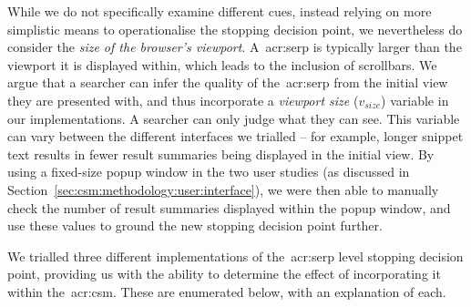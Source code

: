 While we do not specifically examine different cues, instead relying on more simplistic means to operationalise the stopping decision point, we nevertheless do consider the \emph{size of the browser's viewport}. A~\gls{acr:serp} is typically larger than the viewport it is displayed within, which leads to the inclusion of scrollbars. We argue that a searcher can infer the quality of the~\gls{acr:serp} from the initial view they are presented with, and thus incorporate a \emph{viewport size} ($v_{size}$) variable in our implementations. A searcher can only judge what they can see. This variable can vary between the different interfaces we trialled -- for example, longer snippet text results in fewer result summaries being displayed in the initial view. By using a fixed-size popup window in the two user studies (as discussed in Section~\ref{sec:csm:methodology:user:interface}), we were then able to manually check the number of result summaries displayed within the popup window, and use these values to ground the new stopping decision point further.

 We trialled three different implementations of the~\gls{acr:serp} level stopping decision point, providing us with the ability to determine the effect of incorporating it within the~\gls{acr:csm}. These are enumerated below, with an explanation of each.

